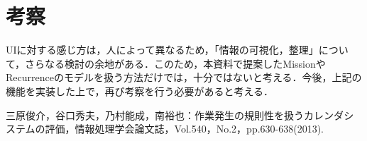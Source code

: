 \documentclass[fleqn, 14pt]{extarticlej}
\begin{document}
\newpage
\section{考察}
UIに対する感じ方は，人によって異なるため，「情報の可視化，整理」について，さらなる検討の余地がある．このため，本資料で提案したMissionやRecurrenceのモデルを扱う方法だけでは，十分ではないと考える．今後，上記の機能を実装した上で，再び考察を行う必要があると考える．

\begin{thebibliography}{99}
三原俊介，谷口秀夫，乃村能成，南裕也：作業発生の規則性を扱うカレンダシステムの評価，情報処理学会論文誌，Vol.540，No.2，pp.630-638(2013).
\end{thebibliography}
\end{document}
